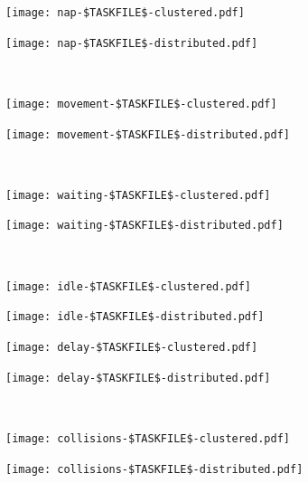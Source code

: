 \documentclass[11pt,a4paper]{article}
\begin{document}
\noindent
\begin{minipage}{0.5\textwidth}
\texttt{[image: nap-\$TASKFILE\$-clustered.pdf]}
\end{minipage}
\begin{minipage}{0.5\textwidth}
\texttt{[image: nap-\$TASKFILE\$-distributed.pdf]}
\end{minipage}
\\[0.2cm]

\noindent
\begin{minipage}{0.5\textwidth}
\texttt{[image: movement-\$TASKFILE\$-clustered.pdf]}
\end{minipage}
\begin{minipage}{0.5\textwidth}
\texttt{[image: movement-\$TASKFILE\$-distributed.pdf]}
\end{minipage}
\\[0.2cm]

\noindent
\begin{minipage}{0.5\textwidth}
\texttt{[image: waiting-\$TASKFILE\$-clustered.pdf]}
\end{minipage}
\begin{minipage}{0.5\textwidth}
\texttt{[image: waiting-\$TASKFILE\$-distributed.pdf]}
\end{minipage}
\\[0.2cm]

\noindent
\begin{minipage}{0.5\textwidth}
\texttt{[image: idle-\$TASKFILE\$-clustered.pdf]}
\end{minipage}
\begin{minipage}{0.5\textwidth}
\texttt{[image: idle-\$TASKFILE\$-distributed.pdf]}
\end{minipage}

\noindent
\begin{minipage}{0.5\textwidth}
\texttt{[image: delay-\$TASKFILE\$-clustered.pdf]}
\end{minipage}
\begin{minipage}{0.5\textwidth}
\texttt{[image: delay-\$TASKFILE\$-distributed.pdf]}
\end{minipage}
\\[0.5cm]

\noindent
\begin{minipage}{0.5\textwidth}
\texttt{[image: collisions-\$TASKFILE\$-clustered.pdf]}
\end{minipage}
\begin{minipage}{0.5\textwidth}
\texttt{[image: collisions-\$TASKFILE\$-distributed.pdf]}
\end{minipage}
\\[0.5cm]
\end{document}
